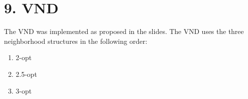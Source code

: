 \section*{9. VND}
The VND was implemented as proposed in the slides. The VND uses the three neighborhood structures in the following order:
\begin{enumerate}
  \item 2-opt
  \item 2.5-opt
  \item 3-opt
\end{enumerate}